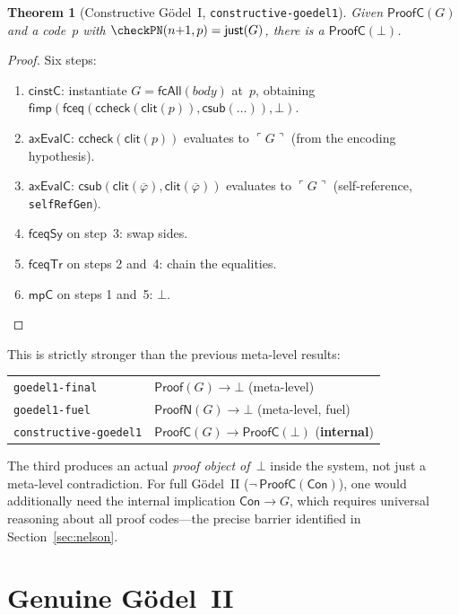\documentclass[11pt]{article}
\newtheorem{theorem}{Theorem}[section]
\newcommand{\Proof}{\mathsf{Proof}}
\newcommand{\ProofN}{\mathsf{ProofN}}
\newcommand{\enc}[1]{\ulcorner #1 \urcorner}
\newcommand{\csub}{\mathsf{csub}}
\newcommand{\clit}{\mathsf{clit}}
\newcommand{\ccheck}{\mathsf{ccheck}}
\newcommand{\fbot}{\bot}
\newcommand{\fimp}{\mathsf{fimp}}
\newcommand{\fceq}{\mathsf{fceq}}
\newcommand{\fcAll}{\mathsf{fcAll}}
\begin{document}
\begin{theorem}[Constructive G\"odel~I, \texttt{constructive-goedel1}]
Given $\mathsf{ProofC}(G)$ and a code~$p$ with
$\checkPN(n{+}1,p) = \mathsf{just}(G)$, there is a
$\mathsf{ProofC}(\fbot)$.
\end{theorem}

\begin{proof}
Six steps:
\begin{enumerate}
\item $\mathsf{cinstC}$: instantiate $G = \fcAll(\mathit{body})$ at~$p$,
  obtaining $\fimp(\fceq(\ccheck(\clit(p)), \csub(\ldots)), \fbot)$.
\item $\mathsf{axEvalC}$: $\ccheck(\clit(p))$ evaluates to $\enc{G}$
  (from the encoding hypothesis).
\item $\mathsf{axEvalC}$: $\csub(\clit(\overline\varphi),
  \clit(\overline\varphi))$ evaluates to $\enc{G}$
  (self-reference, \texttt{selfRefGen}).
\item $\mathsf{fceqSy}$ on step~3: swap sides.
\item $\mathsf{fceqTr}$ on steps 2 and~4: chain the equalities.
\item $\mathsf{mpC}$ on steps 1 and~5: $\fbot$.
\end{enumerate}
\end{proof}

This is strictly stronger than the previous meta-level results:
\begin{center}
\begin{tabular}{@{}ll@{}}
\texttt{goedel1-final} & $\Proof(G) \to \bot$ \quad (meta-level) \\
\texttt{goedel1-fuel} & $\ProofN(G) \to \bot$ \quad (meta-level, fuel) \\
\texttt{constructive-goedel1} &
  $\mathsf{ProofC}(G) \to \mathsf{ProofC}(\fbot)$
  \quad (\textbf{internal})
\end{tabular}
\end{center}

The third produces an actual \emph{proof object of~$\fbot$} inside the
system, not just a meta-level contradiction. For full G\"odel~II
($\neg\,\mathsf{ProofC}(\mathsf{Con})$), one would additionally need
the internal implication $\mathsf{Con} \to G$, which requires universal
reasoning about all proof codes---the precise barrier identified in
Section~\ref{sec:nelson}.

\section{Genuine G\"odel~II}
\label{sec:genuine}
\end{document}

